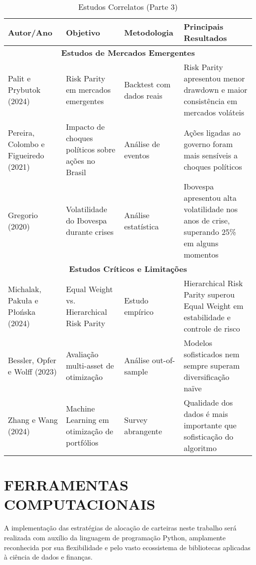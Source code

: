 \begin{table}[H]
\centering
\caption{Estudos Correlatos (Parte 3)}
\begin{tabular}{|p{2.3cm}|p{3.2cm}|p{2.6cm}|p{3.2cm}|}
\hline
\textbf{Autor/Ano} & \textbf{Objetivo} & \textbf{Metodologia} & \textbf{Principais Resultados} \\
\hline
\multicolumn{4}{|c|}{\textbf{Estudos de Mercados Emergentes}} \\
\hline
Palit e Prybutok (2024) & Risk Parity em mercados emergentes & Backtest com dados reais & Risk Parity apresentou menor drawdown e maior consistência em mercados voláteis \\
\hline
Pereira, Colombo e Figueiredo (2021) & Impacto de choques políticos sobre ações no Brasil & Análise de eventos & Ações ligadas ao governo foram mais sensíveis a choques políticos \\
\hline
Gregorio (2020) & Volatilidade do Ibovespa durante crises & Análise estatística & Ibovespa apresentou alta volatilidade nos anos de crise, superando 25\% em alguns momentos \\
\hline
\multicolumn{4}{|c|}{\textbf{Estudos Críticos e Limitações}} \\
\hline
Michalak, Pakuła e Płońska (2024) & Equal Weight vs. Hierarchical Risk Parity & Estudo empírico & Hierarchical Risk Parity superou Equal Weight em estabilidade e controle de risco \\
\hline
Bessler, Opfer e Wolff (2023) & Avaliação multi-asset de otimização & Análise out-of-sample & Modelos sofisticados nem sempre superam diversificação naïve \\
\hline
Zhang e Wang (2024) & Machine Learning em otimização de portfólios & Survey abrangente & Qualidade dos dados é mais importante que sofisticação do algoritmo \\
\hline
\end{tabular}
\label{tab:estudos_correlatos_3}
\end{table}

\section{FERRAMENTAS COMPUTACIONAIS}

A implementação das estratégias de alocação de carteiras neste trabalho será realizada com auxílio da linguagem de programação Python, amplamente reconhecida por sua flexibilidade e pelo vasto ecossistema de bibliotecas aplicadas à ciência de dados e finanças.

